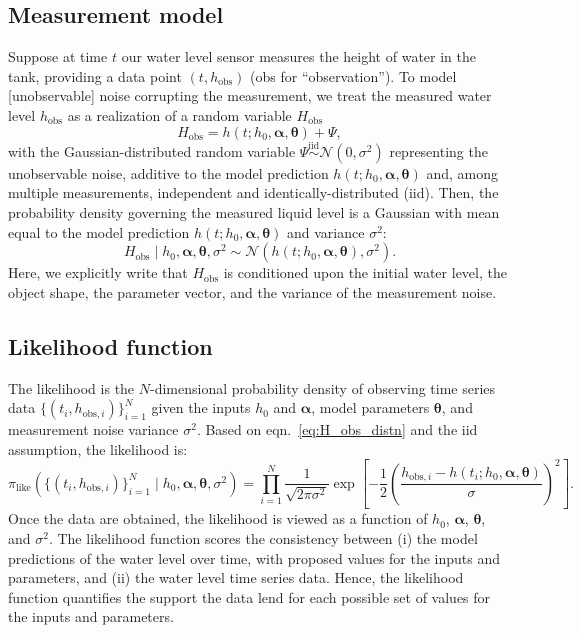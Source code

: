 \documentclass[openacc]{rsproca_new}%
\newcommand\thedata {$\{(t_i,h_{\text{obs}, i})\}_{i=1}^{N}$\xspace}
\newcommand\thedatanomath {\{(t_i,h_{\text{obs}, i})\}_{i=1}^{N}}
\newcommand\themodel {$h(t; h_0, \boldsymbol \alpha, \boldsymbol\theta)$\xspace}
\newcommand\themodelnomath {h(t; h_0, \boldsymbol \alpha, \boldsymbol\theta)}
\begin{document}
\subsection{Measurement model}
Suppose at time $t$ our water level sensor measures the height of water in the tank, providing a data point $(t, h_{\text{obs}})$ (obs for ``observation''). 
To model [unobservable] noise corrupting the measurement, we treat the measured water level $h_{\text{obs}}$ as a realization of a random variable $H_{\text{obs}}$
\begin{equation}
	H_{\text{obs}} = \themodelnomath + \Psi,
\end{equation}
with the Gaussian-distributed random variable $\Psi \overset{\text{iid}}{\sim} \mathcal{N}(0, \sigma^2)$ representing the unobservable noise, additive to the model prediction \themodel and, among multiple measurements, independent and identically-distributed (iid). 
Then, the probability density governing the measured liquid level is a Gaussian with mean equal to the model prediction \themodel and variance $\sigma^2$:
\begin{equation}
	H_{\text{obs}} \mid h_0, \boldsymbol \alpha, \boldsymbol  \theta, \sigma^2 \sim \mathcal{N}(\themodelnomath, \sigma^2). \label{eq:H_obs_distn}
\end{equation} Here, we explicitly write that $H_{\text{obs}}$ is conditioned upon the initial water level, the object shape, the parameter vector, and the variance of the measurement noise.


\subsection{Likelihood function}
The likelihood is the $N$-dimensional probability density of observing time series data \thedata given the inputs $h_0$ and $\boldsymbol \alpha$, model parameters $\boldsymbol \theta$, and measurement noise variance $\sigma^2$. 
Based on eqn.~\ref{eq:H_obs_distn} and the iid assumption, the likelihood is:
\begin{equation}
 \pi_{\text{like}}(\thedatanomath \mid h_0,\boldsymbol  \alpha, \boldsymbol \theta, \sigma^2 ) = \prod_{i=1}^N \frac{1}{\sqrt{2\pi\sigma^2}} \exp \left[-\frac{1}{2}\left(\frac{h_{\text{obs}, i} - h(t_i; h_0, \boldsymbol\alpha, \boldsymbol\theta)}{\sigma} \right)^2 \right]. \label{eq:like}
\end{equation}
Once the data are obtained, the likelihood is viewed as a function of $h_0$, $\boldsymbol \alpha$, $\boldsymbol \theta$, and $\sigma^2$. The likelihood function scores the consistency between (i) the model predictions of the water level over time, with proposed values for the inputs and parameters, and (ii) the water level time series data. Hence, the likelihood function quantifies the support the data lend for each possible set of values for the inputs and parameters. 
\end{document}
